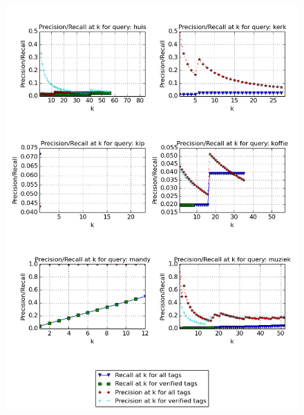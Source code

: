 \begin{figure}[H]
\centering
\includegraphics[width=\textwidth]{appendixd/queries-huis}
\end{figure}


